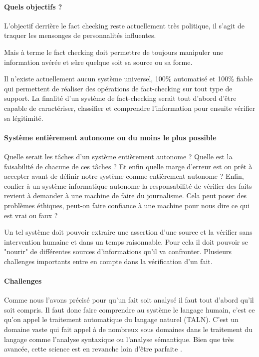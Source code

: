 \paragraph{Quels objectifs ?}

L'objectif derrière le fact checking reste actuellement très politique, il s'agit de traquer les mensonges de personnalités influentes.

Mais à terme le fact checking doit permettre de toujours manipuler une information avérée et sûre quelque soit sa source ou sa forme.

Il n'existe actuellement aucun système universel, 100\% automatisé et 100\% fiable qui permettent de réaliser des opérations de fact-checking sur tout type de support. La finalité d'un système de fact-checking serait tout d'abord d'être capable de caractériser, classifier et comprendre l'information pour ensuite vérifier sa légitimité. 

\paragraph{Système entièrement autonome ou du moins le plus possible}

Quelle serait les tâches d'un système entièrement autonome ? Quelle est la faisabilité de chacune de ces tâches ? Et enfin quelle marge d'erreur est on prêt à accepter avant de définir notre système comme entièrement autonome ? Enfin, confier à un système informatique autonome la responsabilité de vérifier des faits revient à demander à une machine de faire du journalisme. Cela peut poser des problèmes éthiques, peut-on faire confiance à une machine pour nous dire ce qui est vrai ou faux ?

Un tel système doit pouvoir extraire une assertion d'une source et la vérifier sans intervention humaine et dans un temps raisonnable. Pour cela il doit pouvoir se "nourir" de différentes sources d'informations qu'il va confronter. Plusieurs challenges importants entre en compte dans la vérification d'un fait.

\paragraph{Challenges}

Comme nous l'avons précisé pour qu'un fait soit analysé il faut tout d'abord qu'il soit compris. Il faut donc faire comprendre au système le langage humain, c'est ce qu'on appel le traitement automatique du langage naturel (TALN). C'est un domaine vaste qui fait appel à de nombreux sous domaines dans le traitement du langage comme l'analyse syntaxique ou l'analyse sémantique. Bien que très avancée, cette science est en revanche loin d'être parfaite \cite{nlp_not_perfect}.

